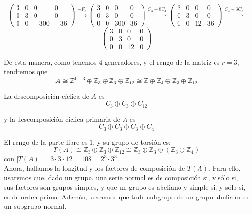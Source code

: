 \documentclass[12pt]{article}
\newcommand{\Z}{\mathbb{Z}}
\begin{document}
\begin{ejercicio}[2 puntos]
\begin{enumerate}[label=(\alph*)]
            $$
            \begin{pmatrix}
                3 & 0 & 0 & 0 \\
                0 & 3 & 0 & 0 \\
                0 & 0 & -300 & -36
            \end{pmatrix}
            \xrightarrow{-F_3}
            \begin{pmatrix}
                3 & 0 & 0 & 0 \\
                0 & 3 & 0 & 0 \\
                0 & 0 & 300 & 36
            \end{pmatrix}
            \xrightarrow{C_3 - 8C_4}
            \begin{pmatrix}
                3 & 0 & 0 & 0 \\
                0 & 3 & 0 & 0 \\
                0 & 0 & 12 & 36
            \end{pmatrix}
            \xrightarrow{C_4 - 3C_3}$$
            $$
            \begin{pmatrix}
                3 & 0 & 0 & 0 \\
                0 & 3 & 0 & 0 \\
                0 & 0 & 12 & 0
            \end{pmatrix}
            $$

            De esta manera, como tenemos $4$ generadores, y el rango de la matriz es $r=3$, tendremos que $$A \cong \Z^{4-3} \oplus \Z_3 \oplus \Z_3 \oplus \Z_{12} \cong \Z \oplus \Z_3 \oplus \Z_3 \oplus \Z_{12}$$

            La descomposición cíclica de $A$ es
            $$C_3 \oplus C_3 \oplus C_{12}$$

            y la descomposición cíclica primaria de $A$ es
            $$C_{3} \oplus C_3 \oplus C_3 \oplus C_4$$
            
            El rango de la parte libre es $1$, y su grupo de torsión es:
            $$T(A) \cong \Z_3 \oplus \Z_3 \oplus \Z_{12} \cong \Z_3 \oplus \Z_3 \oplus \left( \Z_3 \oplus \Z_4 \right)$$
            con $|T(A)| = 3 \cdot 3 \cdot 12 = 108 = 2^{3} \cdot 3^3$. \\

            Ahora, hallamos la longitud y los factores de composición de $T(A)$. Para ello, usaremos que, dado un grupo, una serie normal es de composición si, y sólo si, sus factores son grupos simples, y que un grupo es abeliano y simple si, y sólo si, es de orden primo.
            Además, usaremos que todo subgrupo de un grupo abeliano es un subgrupo normal.


\end{enumerate}
\end{ejercicio}
\end{document}
